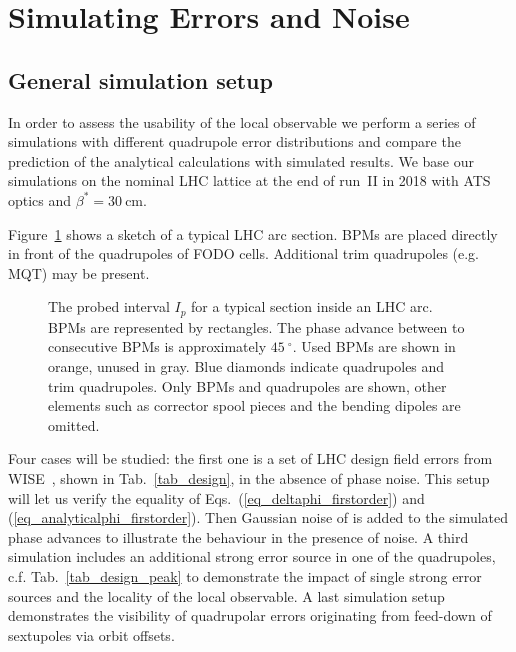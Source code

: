 
\section{Simulating Errors and Noise}
\label{sec_lobster}
\label{sec:robustness_check}

\subsection{General simulation setup}

In order to assess the usability of the local observable we perform a series of simulations with different
quadrupole error distributions and compare the prediction of the analytical calculations with simulated results. 
We base our simulations on the nominal LHC lattice at the end of run~II in 2018 with ATS optics and 
$\beta^*=\SI{30}{\centi\metre}$.

Figure~\ref{fig_combination} shows a sketch of a typical LHC arc section. BPMs are placed directly in
front of the quadrupoles of FODO cells. Additional trim quadrupoles (e.g. MQT) may be present.
%
\begin{figure}[htbp]
  \centering
  
  \caption{The probed interval $I_p$ for a typical section inside an LHC arc.
    BPMs are represented by rectangles.
    The phase advance between to consecutive BPMs is approximately $\SI{45}{^\circ}$.
    Used BPMs are shown in orange, unused in gray.
    Blue diamonds indicate quadrupoles and trim quadrupoles.
    Only BPMs and quadrupoles are shown, other elements such as corrector spool pieces and the
    bending dipoles are omitted.
  }
  \label{fig_combination}
\end{figure}
%
%
Four cases will be studied: the first one is a set of LHC design field
errors from WISE~\cite{wise1,wise2}, shown in Tab.~\ref{tab_design}, in the absence of phase noise.
This setup will let us verify the equality of Eqs.~(\ref{eq_deltaphi_firstorder}) and (\ref{eq_analyticalphi_firstorder}).
Then Gaussian noise of \noiserms{} is added to the simulated phase advances to illustrate the behaviour
in the presence of noise.
A third simulation includes an additional strong error source in one of the quadrupoles, c.f. Tab.~\ref{tab_design_peak}
to demonstrate the impact of single strong error sources and the locality of the local observable.
A last simulation setup demonstrates the visibility of quadrupolar errors originating from feed-down
of sextupoles via orbit offsets.

